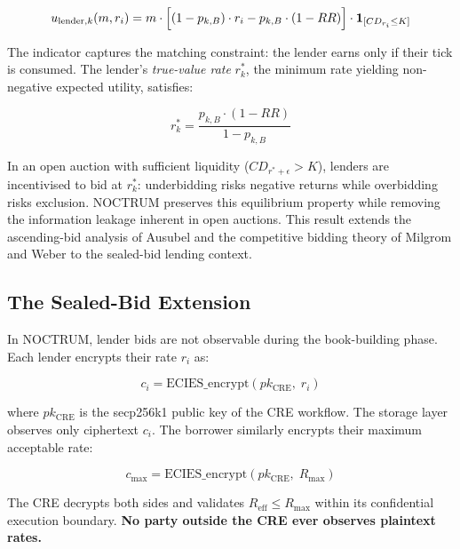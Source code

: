 \documentclass[a4paper,11pt]{article}
\begin{document}
\begin{equation}
    u_{\text{lender},k}(m, r_i)
    = m \cdot \Bigl[(1 - p_{k,B}) \cdot r_i
                    - p_{k,B} \cdot (1 - RR)\Bigr]
      \cdot \mathbf{1}_{[CD_{r_i} \leq K]}
    \label{eq:lenderutil}
\end{equation}

The indicator captures the matching constraint: the lender earns only if
their tick is consumed. The lender's \textit{true-value rate} $r_k^*$, the
minimum rate yielding non-negative expected utility, satisfies:

\begin{equation}
    \boxed{r_k^* = \frac{p_{k,B} \cdot (1 - RR)}{1 - p_{k,B}}}
    \label{eq:truevalue}
\end{equation}

In an open auction with sufficient liquidity ($CD_{r^*+\epsilon} > K$),
lenders are incentivised to bid at $r_k^*$: underbidding risks negative
returns while overbidding risks exclusion. NOCTRUM preserves this equilibrium
property while removing the information leakage inherent in open auctions.
This result extends the ascending-bid analysis of Ausubel \cite{ausubel2004}
and the competitive bidding theory of Milgrom and Weber \cite{milgrom1982}
to the sealed-bid lending context.

\subsection{The Sealed-Bid Extension}

In NOCTRUM, lender bids are not observable during the book-building phase.
Each lender encrypts their rate $r_i$ as:

\begin{equation}
    c_i = \mathrm{ECIES\_encrypt}(pk_{\mathrm{CRE}},\; r_i)
    \label{eq:encrypt}
\end{equation}

where $pk_{\mathrm{CRE}}$ is the secp256k1 public key of the CRE workflow.
The storage layer observes only ciphertext $c_i$. The borrower similarly
encrypts their maximum acceptable rate:

\begin{equation}
    c_{\max} = \mathrm{ECIES\_encrypt}(pk_{\mathrm{CRE}},\; R_{\max})
    \label{eq:borrowerencrypt}
\end{equation}

The CRE decrypts both sides and validates $R_{\text{eff}} \leq R_{\max}$
within its confidential execution boundary.
\textbf{No party outside the CRE ever observes plaintext rates.}
\end{document}
